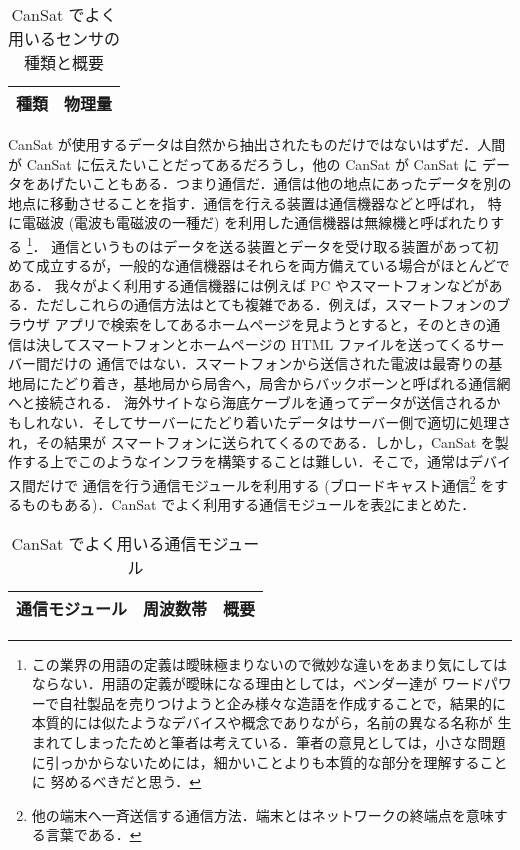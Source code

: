 \documentclass[dvipdfmx]{jsarticle}
\begin{document}
\begin{table}[htbp]
  \centering
  \caption{CanSat でよく用いるセンサの種類と概要}
  \begin{tabular}{c|r} \hline
    種類 & 物理量 \\ \hline
  \end{tabular}
  \label{tab:2.2.2-sensors}
\end{table}

CanSat が使用するデータは自然から抽出されたものだけではないはずだ．人間が CanSat に伝えたいことだってあるだろうし，他の CanSat が CanSat に
データをあげたいこともある．つまり通信だ．通信は他の地点にあったデータを別の地点に移動させることを指す．通信を行える装置は通信機器などと呼ばれ，
特に電磁波 (電波も電磁波の一種だ) を利用した通信機器は無線機と呼ばれたりする
\footnote{この業界の用語の定義は曖昧極まりないので微妙な違いをあまり気にしてはならない．用語の定義が曖昧になる理由としては，ベンダー達が
ワードパワーで自社製品を売りつけようと企み様々な造語を作成することで，結果的に本質的には似たようなデバイスや概念でありながら，名前の異なる名称が
生まれてしまったためと筆者は考えている．筆者の意見としては，小さな問題に引っかからないためには，細かいことよりも本質的な部分を理解することに
努めるべきだと思う．}．
通信というものはデータを送る装置とデータを受け取る装置があって初めて成立するが，一般的な通信機器はそれらを両方備えている場合がほとんどである．
我々がよく利用する通信機器には例えば PC やスマートフォンなどがある．ただしこれらの通信方法はとても複雑である．例えば，スマートフォンのブラウザ
アプリで検索をしてあるホームページを見ようとすると，そのときの通信は決してスマートフォンとホームページの HTML ファイルを送ってくるサーバー間だけの
通信ではない．スマートフォンから送信された電波は最寄りの基地局にたどり着き，基地局から局舎へ，局舎からバックボーンと呼ばれる通信網へと接続される．
海外サイトなら海底ケーブルを通ってデータが送信されるかもしれない．そしてサーバーにたどり着いたデータはサーバー側で適切に処理され，その結果が
スマートフォンに送られてくるのである．しかし，CanSat を製作する上でこのようなインフラを構築することは難しい．そこで，通常はデバイス間だけで
通信を行う通信モジュールを利用する (ブロードキャスト通信\footnote{他の端末へ一斉送信する通信方法．端末とはネットワークの終端点を意味する言葉である．}
をするものもある)．CanSat でよく利用する通信モジュールを表\ref{tab:2.2.2-communication-modules}にまとめた．

\begin{table}[htbp]
  \centering
  \caption{CanSat でよく用いる通信モジュール}
  \begin{tabular}{c|c|r} \hline
    通信モジュール & 周波数帯 & 概要 \\ \hline
  \end{tabular}
  \label{tab:2.2.2-communication-modules}
\end{table}
\end{document}
